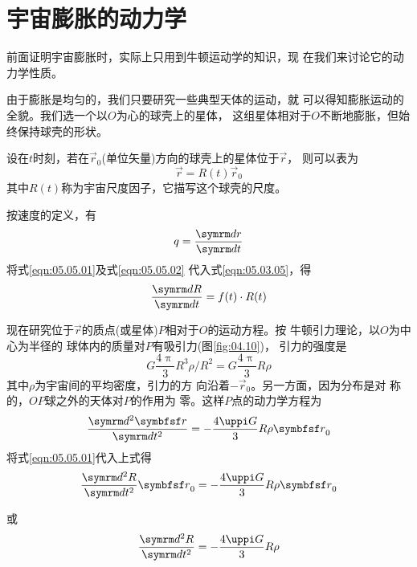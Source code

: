 \section{宇宙膨胀的动力学}\label{sec:05.05}

前面证明宇宙膨胀时，实际上只用到牛顿运动学的知识，现
在我们来讨论它的动力学性质。

由于膨胀是均匀的，我们只要研究一些典型天体的运动，就
可以得知膨胀运动的全貌。我们选一个以$ O $为心的球壳上的星体，
这组星体相对于$ O $不断地膨胀，但始终保持球壳的形状。

设在$ t $时刻，若在$ \vec{r}_0 $(单位矢量)方向的球壳上的星体位于$ \vec{r} $，
则可以表为
\begin{equation}\label{eqn:05.05.01}
 \vec{r} = R ( t ) \vec{r} _ { 0 }
\end{equation}
其中$ R(t) $称为宇宙尺度因子，它描写这个球壳的尺度。

按速度的定义，有
\begin{equation}\label{eqn:05.05.02}
 q = \frac { \dif r } { \dif t }
\end{equation}
将式\eqref{eqn:05.05.01}及式\eqref{eqn:05.05.02} 代入式\eqref{eqn:05.03.05}，得
\begin{equation}\label{eqn:05.05.03}
 \frac { \dif R } { \dif t } = f ( t ) \cdot R ( t )
\end{equation}

现在研究位于$\vec{r}$的质点(或星体)$ P $相对于$ O $的运动方程。按
牛顿引力理论，以$ O $为中心为半径的
球体内的质量对$ P $有吸引力(图\ref{fig:04.10})，
引力的强度是
\begin{equation*}
 G \frac { 4 \uppi } { 3 } R ^ { 3 } \rho / R ^ { 2 } = G \frac { 4 \uppi } { 3 } R \rho
\end{equation*}
其中$ \rho $为宇宙间的平均密度，引力的方
向沿着$ - \vec{r} _ 0 $。另一方面，因为分布是对
称的，$ OP $球之外的天体对$ P $的作用为
零。这样$ P $点的动力学方程为
\begin{equation*}
 \frac { \dif ^ { 2 } \vec{r} } { \dif t ^ { 2 } } = - \frac { 4 \uppi G } { 3 } R \rho \vec{ r } _ 0
\end{equation*}
将式\eqref{eqn:05.05.01}代入上式得
\begin{equation*}
 \frac { \dif ^ { 2 } R } { \dif t ^ { 2 } } \vec{r} _ { 0 } = - \frac { 4 \uppi G } { 3 } R \rho \vec{r} _ 0
\end{equation*}

\clearpage
\noindent 或 \vspace{-0.6em}
\begin{equation}\label{eqn:05.05.04}
 \frac { \dif ^ { 2 } R } { \dif t ^ { 2 } } = - \frac { 4 \uppi G } { 3 } R \rho
\end{equation}

